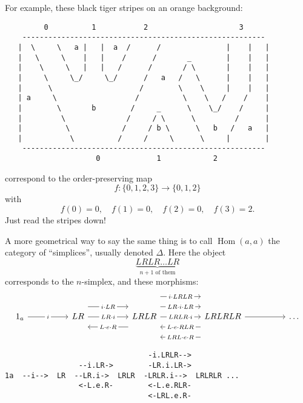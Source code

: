 \documentclass{article}
\begin{document}
For example, these black tiger stripes on an orange background:

\begin{verbatim}
         0          1           2                     3
    --------------------------------------------------------
   |  \     \   a |   |  a  /      /               |    |   |
   |   \     \    |   |    /      /       _        |    |   |
   |    \     \   |   |   /      /       / \       |    |   |
   |     \     \_/     \_/      /   a   /   \      |    |   |
   |      \                    /        \    \     |    |   |
   | a     \                  /          \    \   /    /    |
   |        \       b        /     _      \    \_/    /     |
   |         \              /     / \      \         /      |
   |          \            /     / b \      \   b   /   a   |
   |           \          /     /     \      \     |        |
    --------------------------------------------------------
                     0             1            2
\end{verbatim}

correspond to the order-preserving map
\[f\colon \{0,1,2,3\} \to \{0,1,2\}\] with
\[f(0) = 0,\quad f(1) = 0,\quad f(2) = 0,\quad f(3) = 2.\] Just read the
stripes down!

A more geometrical way to say the same thing is to call
\(\operatorname{Hom}(a,a)\) the category of ``simplices'', usually
denoted \(\Delta\). Here the object
\[\underbrace{LRLR\ldots LR}_{\mbox{$n+1$ of them}}\] corresponds to the
\(n\)-simplex, and these morphisms: \[
  \begin{tikzcd}[column sep=huge]
    1_a
      \rar["i" description]
    & LR
      \rar[shift left=5,"i\cdot LR" description]
      \rar["LR\cdot i" description]
    & LRLR
      \rar[shift left=10,"i\cdot LRLR" description]
      \rar[shift left=5,"LR\cdot i\cdot LR" description]
      \rar["LRLR\cdot i" description]
      \lar[shift left=5,"L\cdot e\cdot R" description]
    & LRLRLR
      \lar[shift left=5,"L\cdot e\cdot RLR" description]
      \lar[shift left=10,"LRL\cdot e\cdot R" description]
      \rar
    &\ldots
  \end{tikzcd}
\]

\begin{verbatim}
                                 -i.LRLR-->
                 --i.LR->        -LR.i.LR->
1a  --i-->  LR  --LR.i->  LRLR  -LRLR.i-->  LRLRLR ...
                 <-L.e.R-        <-L.e.RLR-
                                 <-LRL.e.R-
\end{verbatim}
\end{document}
